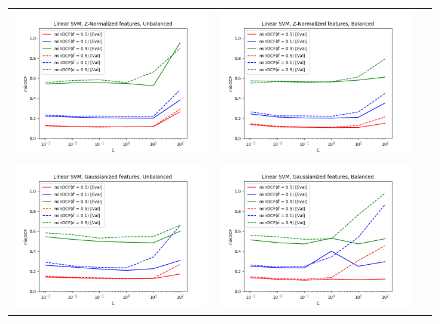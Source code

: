 \documentclass[12pt,a4paper]{article}
\begin{document}
\begin{figure}[H]
    \begin{center}
        \hspace*{-25pt}
        \begin{tabular}{ccc}
            \includegraphics[width = 200pt]{img/evaluation_plots/evaluation-linear-svm-z-normalized-unbalanced.png} &
            \includegraphics[width = 200pt]{img/evaluation_plots/evaluation-linear-svm-z-normalized-balanced.png}    \\
            \includegraphics[width = 200pt]{img/evaluation_plots/evaluation-linear-svm-gaussianized-unbalanced.png} &
            \includegraphics[width = 200pt]{img/evaluation_plots/evaluation-linear-svm-gaussianized-balanced.png}     \\
        \end{tabular}
    \end{center}
\end{figure}
\end{document}
